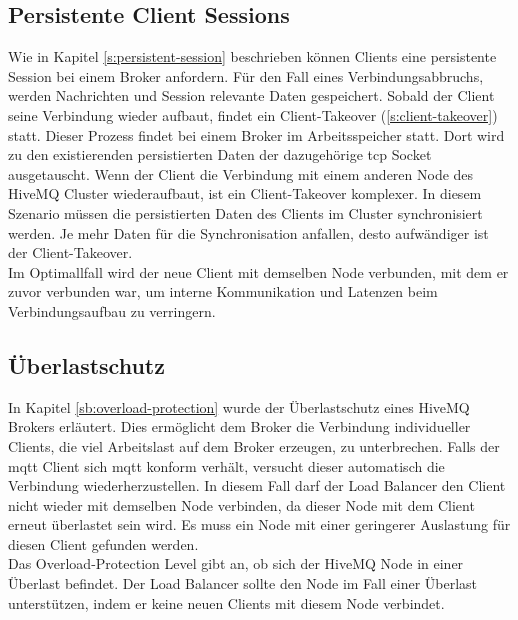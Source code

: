 \subsection{Persistente Client Sessions} \label{sp:persistent-session}
Wie in Kapitel \ref{s:persistent-session} beschrieben können Clients eine persistente Session bei einem Broker anfordern.
Für den Fall eines Verbindungsabbruchs, werden Nachrichten und Session relevante Daten gespeichert.
Sobald der Client seine Verbindung wieder aufbaut, findet ein Client-Takeover (\ref{s:client-takeover}) statt.
Dieser Prozess findet bei einem Broker im Arbeitsspeicher statt.
Dort wird zu den existierenden persistierten Daten der dazugehörige \ac{tcp} Socket ausgetauscht.
Wenn der Client die Verbindung mit einem anderen Node des HiveMQ Cluster wiederaufbaut, ist ein Client-Takeover komplexer.
In diesem Szenario müssen die persistierten Daten des Clients im Cluster synchronisiert werden.
Je mehr Daten für die Synchronisation anfallen, desto aufwändiger ist der Client-Takeover.
\\
Im Optimallfall wird der neue Client mit demselben Node verbunden, mit dem er zuvor verbunden war, um interne Kommunikation und Latenzen beim Verbindungsaufbau zu verringern.

\subsection{Überlastschutz}
In Kapitel \ref{sb:overload-protection} wurde der Überlastschutz eines HiveMQ Brokers erläutert. Dies ermöglicht dem Broker die Verbindung individueller Clients, die viel Arbeitslast auf dem Broker erzeugen, zu unterbrechen. Falls der \ac{mqtt} Client sich \ac{mqtt} konform verhält, versucht dieser automatisch die Verbindung wiederherzustellen.
In diesem Fall darf der Load Balancer den Client nicht wieder mit demselben Node verbinden, da dieser Node mit dem Client erneut überlastet sein wird. Es muss ein Node mit einer geringerer Auslastung für diesen Client gefunden werden.
\\
Das Overload-Protection Level gibt an, ob sich der HiveMQ Node in einer Überlast befindet.
Der Load Balancer sollte den Node im Fall einer Überlast unterstützen, indem er keine neuen Clients mit diesem Node verbindet.

